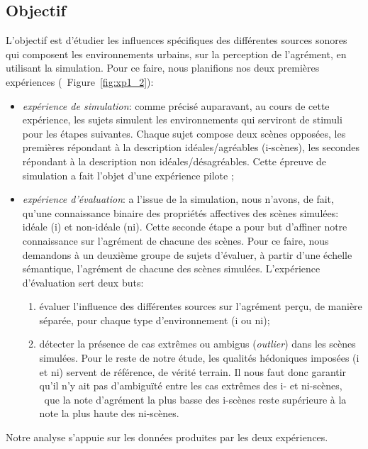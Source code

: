 \subsection{Objectif}

L'objectif est d'étudier les influences spécifiques des différentes sources sonores qui composent les environnements urbains, sur la perception de l'agrément, en utilisant la simulation. Pour ce faire, nous planifions nos deux premières expériences (\cf~Figure~\ref{fig:xp1_2}):

\begin{itemize}
\item \emph{expérience de simulation}: comme précisé auparavant, au cours de cette expérience, les sujets simulent les environnements qui serviront de stimuli pour les étapes suivantes. Chaque sujet compose deux scènes opposées, les premières répondant à la description idéales/agréables (i-scènes), les secondes répondant à la description non idéales/désagréables. Cette épreuve de simulation a fait l'objet d'une expérience pilote \citep{lafay2013atiam,lafay2014new}; 
\item \emph{expérience d'évaluation}: a l'issue de la simulation, nous n'avons, de fait, qu'une connaissance binaire des propriétés affectives des scènes simulées: idéale (i) et non-idéale (ni). Cette seconde étape a pour but d'affiner notre connaissance sur l'agrément de chacune des scènes. Pour ce faire, nous demandons à un deuxième groupe de sujets d'évaluer, à partir d'une échelle sémantique, l'agrément de chacune des scènes simulées. L'expérience d'évaluation sert deux buts:
\begin{enumerate}
\item évaluer l'influence des différentes sources sur l'agrément perçu, de manière séparée, pour chaque type d'environnement (i ou ni);
\item détecter la présence de cas extrêmes ou ambigus (\emph{outlier}) dans les scènes simulées. Pour le reste de notre étude, les qualités hédoniques imposées (i et ni) servent de référence, de vérité terrain. Il nous faut donc garantir qu'il n'y ait pas d’ambiguïté entre les cas extrêmes des i- et ni-scènes, \ie~que la note d'agrément la plus basse des i-scènes reste supérieure à la note la plus haute des ni-scènes.
\end{enumerate}

\end{itemize}

Notre analyse s'appuie sur les données produites par les deux expériences.

